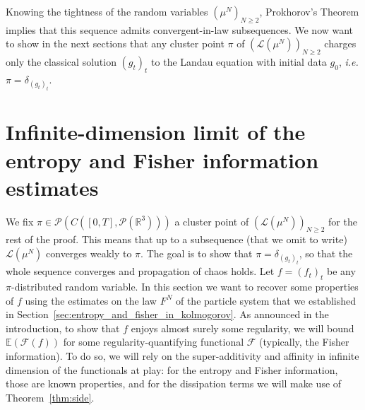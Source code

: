 \documentclass[11pt,a4paper]{article}
\theoremstyle{definition}
\theoremstyle{plain}
\begin{document}
Knowing the tightness of the random variables $(\mu^N)_{N\geq 2}$, Prokhorov's Theorem implies that this sequence admits convergent-in-law subsequences.
We now want to show in the next sections that any cluster point $\pi$ of $(\mathcal{L}(\mu^N))_{N\geq 2 }$ charges only the classical solution $(g_t)_t$ to the Landau equation with initial data $g_0$, \textit{i.e.} $\pi=\delta_{(g_t)_t}$.

\section{Infinite-dimension limit of the entropy and Fisher information estimates}
\label{sec:infinite-dimension limit of the regularity estimates}
We fix $\pi \in \mathcal{P}\left(C([0,T],\mathcal{P}(\mathbb{R}^3)) \right)$ a cluster point of $(\mathcal{L}(\mu^N))_{N\geq 2 }$ for the rest of the proof. This means that up to a subsequence (that we omit to write) $\mathcal{L}(\mu^N)$ converges weakly to $\pi$. The goal is to show that $\pi=\delta_{(g_t)_t}$, so that the whole sequence converges and propagation of chaos holds. Let $f=(f_t)_t$ be any $\pi$-distributed random variable. In this section we want to recover some properties of $f$ using the estimates on the law $F^N$ of the particle system that we established in Section~\ref{sec:entropy_and_fisher_in_kolmogorov}. As announced in the introduction, to show that $f$ enjoys almost surely some regularity, we will bound $\mathbb{E}(\mathcal{F}(f))$ for some regularity-quantifying functional $\mathcal{F}$ (typically, the Fisher information). To do so, we will rely on the super-additivity and affinity in infinite dimension of the functionals at play: for the entropy and Fisher information, those are known properties, and for the dissipation terms we will make use of Theorem~\ref{thm:side}.
\end{document}
